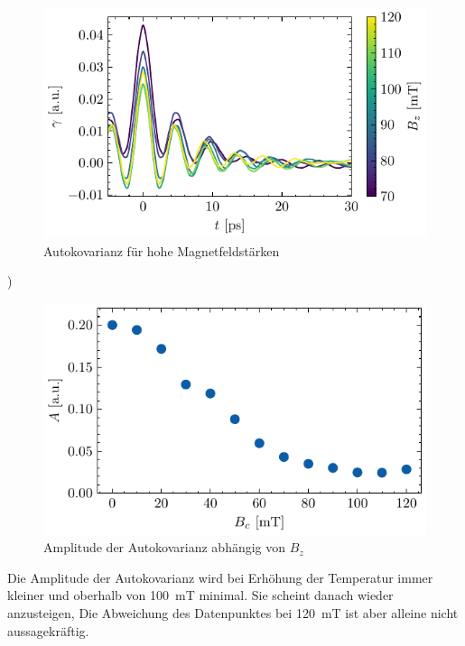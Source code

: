 \documentclass[main.tex]{subfiles}
\begin{document}




\begin{figure}[H]
    \centering
    \includegraphics{bilder/plots/max_Bz/autocov_high.pdf}
    \caption{Autokovarianz für hohe Magnetfeldstärken}\label{fig:bz-autocov-high}
\end{figure})


\begin{figure}[H]
    \centering
    \includegraphics{bilder/plots/max_Bz/rauschamplitude.pdf}
    \caption{Amplitude der Autokovarianz abhängig von \(B_z\)}\label{fig:bz-rauschampl}
\end{figure}

Die Amplitude der Autokovarianz wird bei Erhöhung der Temperatur immer kleiner und oberhalb von \SI{100}{\milli\tesla} minimal. Sie scheint danach wieder anzusteigen, Die Abweichung des Datenpunktes bei \SI{120}{\milli\tesla} ist aber alleine nicht aussagekräftig. 


\end{document}
